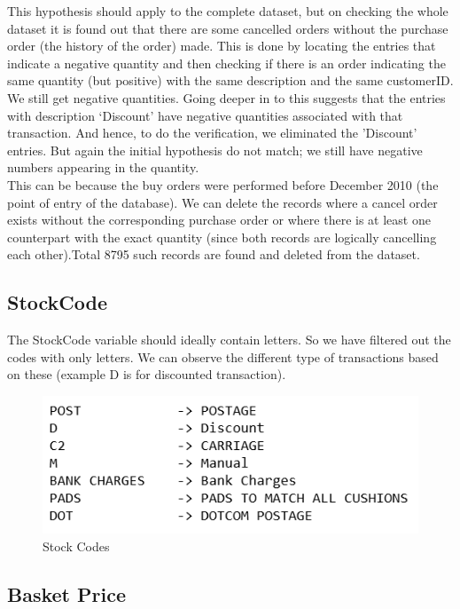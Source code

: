 This hypothesis should apply to the complete dataset, but on checking the whole dataset it is found out that there are some cancelled orders without the purchase order (the history of the order) made. This is done by locating the entries that indicate a negative quantity and then checking if there is an order indicating the same quantity (but positive) with the same description and the same customerID. We still get negative quantities. Going deeper in to this suggests that the entries with description `Discount' have negative quantities associated with that transaction. And hence, to do the verification, we eliminated the 'Discount' entries. But again the initial hypothesis do not match; we still have negative numbers appearing in the quantity.\\
This can be because the buy orders were performed before December 2010 (the point of entry of the database). We can delete the records where a cancel order exists without the corresponding purchase order or where there is at least one counterpart with the exact quantity (since both records are logically cancelling each other).Total 8795 such records are found and deleted from the dataset.\\

\subsection{StockCode}

The StockCode variable should ideally contain letters. So we have filtered out the codes with only letters. We can observe the different type of transactions based on these (example D is for discounted transaction).\\

\begin{figure}[H]
\caption{Stock Codes}
\label{2.4}
\centering
\includegraphics[width=\columnwidth]{images/2_4.PNG}
\end{figure}

\subsection{Basket Price}

